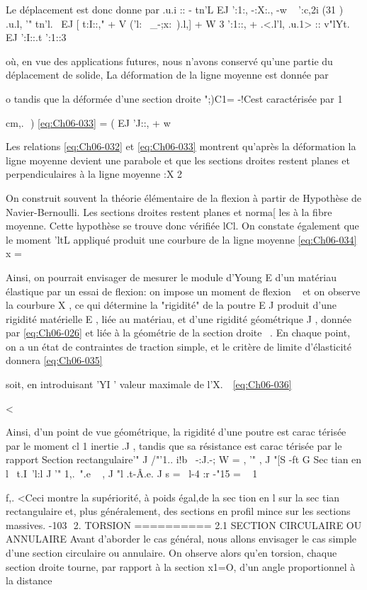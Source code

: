 Le déplacement est donc donne par 
.u.i  ::  - tn'L EJ  ':1:, -:X:.,  -w ~  ':c,2i  
(31 )  .u.l,  '"  tn'l. ~EJ  [ t:I::,"  +  V ('l:~ _-;x:~).l,]  + W 3 ':1::,  + .<.l'l,  
.u.1>  ::  v"lYt. EJ  ':I::.t ':1::3  

où, en vue des applications futures, nous n'avons conservé qu'une partie du déplacement de solide, La déformation de la ligne moyenne est donnée par 

o
tandis que la déformée d'une section droite ";)C1= -!Cest caractérisée par
1 

cm,.  ) 
\eqref{eq:Ch06-033} 
=
( EJ 'J::, + w~ 

Les relations \eqref{eq:Ch06-032} et \eqref{eq:Ch06-033} montrent qu'après la déformation la ligne moyenne devient une parabole et que les sections droites restent planes et perpendi­culaires à la ligne moyenne 
:X
2 

On construit souvent la théorie élémentaire de la flexion à partir de 
Hypothèse de Navier-Bernoulli. Les sections droites restent planes et norma­[ les à la fibre moyenne. 
Cette hypothèse se trouve donc vérifiée lCl. On constate également que le moment 'ltL appliqué produit une courbure de la ligne moyenne 
\eqref{eq:Ch06-034} 
x = 

Ainsi, on pourrait envisager de mesurer le module d'Young E d'un matériau élastique par un essai de flexion: on impose un moment de flexion ~ et on observe la courbure X , ce qui détermine la "rigidité" de la poutre E J produit d'une rigidité matérielle E , liée au matériau, et d'une rigidité géométrique J , donnée par \eqref{eq:Ch06-026} et liée à la géométrie de la section droite 
~. 
En chaque point, on a un état de contraintes de traction simple, et le critère de limite d'élasticité donnera 
\eqref{eq:Ch06-035} 


soit, en introduisant 'YI ' valeur maximale de l'X.~\ 
\eqref{eq:Ch06-036} 

< 

Ainsi, d'un point de vue géométrique, la rigidité d'une poutre est 
carac térisée  par le moment  cl 1 inertie  .J  ,  tandis  que  sa  résistance  est  carac­ 
térisée par le rapport Section rectangulaire'"  J /"'1..  
i!b~ -:J.-; W  
 =  ,  '"  ,  J "[S  -ft G  
Sec tian  en  l  
~t.I~'l:l  J  '"  1,.~".e ~  ,  J "l  .t-Â.e.  J s  =  ~l­-4  :r -"15  =  ~ 1­ 

f,. <­Ceci montre la supériorité, à poids égal,de la sec tion en l sur la sec tian rectangulaire et, plus généralement, des sections en profil mince sur les sections massives. 
-103 ­
2. TORSION 
========== 
2.1 SECTION CIRCULAIRE OU ANNULAIRE 
Avant d'aborder le cas général, nous allons envisager le cas simple d'une section circulaire ou annulaire. On ohserve alors qu'en torsion, chaque section droite tourne, par rapport à la section x1=O, d'un angle proportion­nel à la distance 


